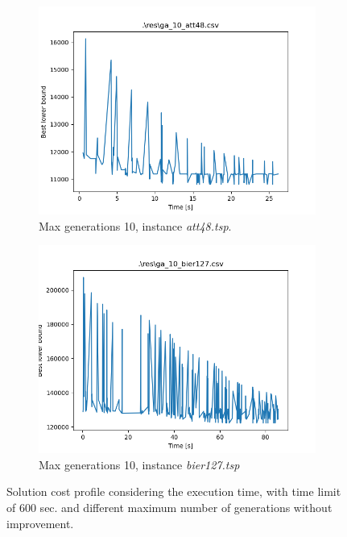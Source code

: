 \begin{figure}[!h]
\begin{subfigure}{.5\columnwidth}
		\includegraphics[width=\columnwidth]{../res/ga_10_att48.png}
		\caption{Max generations 10, instance \textit{att48.tsp}.}
		\label{fig:ga_10_att48}
	\end{subfigure}
	\begin{subfigure}{.5\columnwidth}
		\centering
		\includegraphics[width=\columnwidth]{../res/ga_10_bier127.png}
		\caption{Max generations 10, instance \textit{bier127.tsp}}
		\label{fig:ga_10_bier127}
	\end{subfigure}
	\caption{Solution cost profile considering the execution time, with time limit of $600$ sec. and different maximum number of generations without improvement.}
	\label{fig:ga_50_10}
\end{figure}

